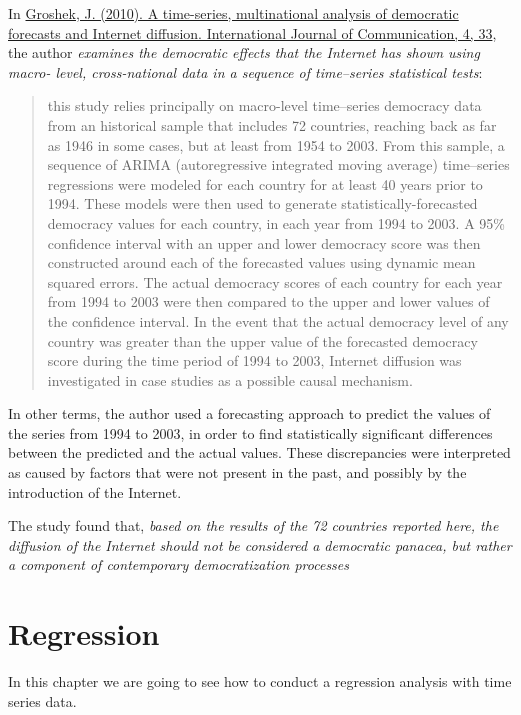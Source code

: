 \documentclass[
]{article}
\begin{document}
In \href{https://ijoc.org/index.php/ijoc/article/viewFile/495/392}{Groshek, J. (2010). A time-series, multinational analysis of democratic forecasts and Internet diffusion. International Journal of Communication, 4, 33}, the author \emph{examines the democratic effects that the Internet has shown using macro- level, cross-national data in a sequence of time--series statistical tests}:

\begin{quote}
this study relies principally on macro-level time--series democracy data from an historical sample that includes 72 countries, reaching back as far as 1946 in some cases, but at least from 1954 to 2003. From this sample, a sequence of ARIMA (autoregressive integrated moving average) time--series regressions were modeled for each country for at least 40 years prior to 1994. These models were then used to generate statistically-forecasted democracy values for each country, in each year from 1994 to 2003. A 95\% confidence interval with an upper and lower democracy score was then constructed around each of the forecasted values using dynamic mean squared errors. The actual democracy scores of each country for each year from 1994 to 2003 were then compared to the upper and lower values of the confidence interval.
In the event that the actual democracy level of any country was greater than the upper value of the forecasted democracy score during the time period of 1994 to 2003, Internet diffusion was investigated in case studies as a possible causal mechanism.
\end{quote}

In other terms, the author used a forecasting approach to predict the values of the series from 1994 to 2003, in order to find statistically significant differences between the predicted and the actual values. These discrepancies were interpreted as caused by factors that were not present in the past, and possibly by the introduction of the Internet.

The study found that, \emph{based on the results of the 72 countries reported here, the diffusion of the Internet should not be considered a democratic panacea, but rather a component of contemporary democratization processes}

\section{Regression}\label{regression}

In this chapter we are going to see how to conduct a regression analysis with time series data.
\end{document}
